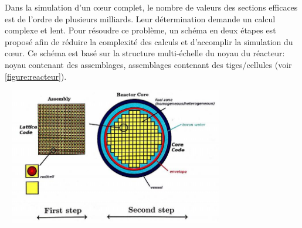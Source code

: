 Dans la simulation d'un cœur complet, le nombre de valeurs des sections efficaces est de l'ordre de plusieurs milliards. Leur détermination demande un calcul complexe et lent. Pour résoudre ce problème, un schéma en deux étapes est proposé afin de réduire la complexité des calculs et d'accomplir la simulation du cœur. Ce schéma est basé sur la structure multi-échelle du noyau du réacteur: noyau contenant des assemblages, assemblages contenant des tiges/cellules (voir \ref{figure:reacteur}).
\begin{center}
\includegraphics[height=6cm,width=10cm]{images/figure2.jpg}
\label{figure:reacteur}
\end{center}

